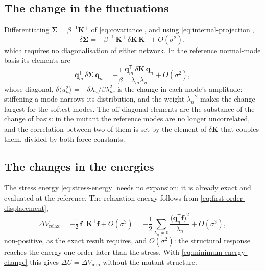 \documentclass[11pt]{article}
\newcommand{\KK}{\mathbf{K}}
\begin{document}
\subsection*{The change in the fluctuations}

Differentiating $\bm{\Sigma} = \beta^{-1}\KK^{+}$ of \eqref{eq:covariance}, and using \eqref{eq:internal-projection},
\begin{equation}
\boxed{
\delta\bm{\Sigma} = -\beta^{-1}\, \KK^{+}\, \delta\KK\, \KK^{+} + O(\sigma^{2}) ,
}
\label{eq:covariance-change}
\end{equation}
which requires no diagonalisation of either network.
In the reference normal-mode basis its elements are
\begin{equation}
\boxed{
\mathbf{q}_m^{\mathsf T}\, \delta\bm{\Sigma}\, \mathbf{q}_n
= -\frac{1}{\beta}\, \frac{\mathbf{q}_m^{\mathsf T}\, \delta\KK\, \mathbf{q}_n}{\lambda_m \lambda_n}
+ O(\sigma^{2}) ,
}
\label{eq:covariance-change-modal}
\end{equation}
whose diagonal, $\delta\langle u_n^{2}\rangle = -\delta\lambda_n/\beta\lambda_n^{2}$, is the change in each mode's amplitude: stiffening a mode narrows its distribution, and the weight $\lambda_n^{-2}$ makes the change largest for the softest modes.
The off-diagonal elements are the substance of the change of basis: in the mutant the reference modes are no longer uncorrelated, and the correlation between two of them is set by the element of $\delta\KK$ that couples them, divided by both force constants.

\subsection*{The changes in the energies}

The stress energy \eqref{eq:stress-energy} needs no expansion: it is already exact and evaluated at the reference.
The relaxation energy follows from \eqref{eq:first-order-displacement},
\begin{equation}
\boxed{
\Delta V_{\text{relax}} = -\tfrac12\, \mathbf{f}^{\mathsf T}\KK^{+}\mathbf{f} + O(\sigma^{3})
= -\frac{1}{2}\sum_{\lambda_n \ne 0} \frac{\big(\mathbf{q}_n^{\mathsf T}\mathbf{f}\big)^{2}}{\lambda_n}
+ O(\sigma^{3}) ,
}
\label{eq:first-order-relaxation}
\end{equation}
non-positive, as the exact result requires, and $O(\sigma^{2})$: the structural response reaches the energy one order later than the stress.
With \eqref{eq:minimum-energy-change} this gives $\Delta U = \Delta V_{\min}$ without the mutant structure.
\end{document}
